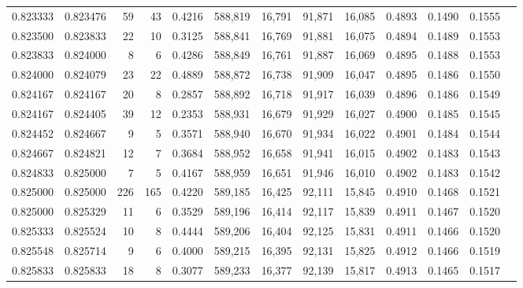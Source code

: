 \begin{tabular}{rrrrrrrrrrrrr}
0.823333 & 0.823476 &    59 &  43 &                                     0.4216 & 588,819 &  16,791 &  91,871 &  16,085 & 0.4893 & 0.1490 & 0.1555 \\
0.823500 & 0.823833 &    22 &  10 &                                     0.3125 & 588,841 &  16,769 &  91,881 &  16,075 & 0.4894 & 0.1489 & 0.1553 \\
0.823833 & 0.824000 &     8 &   6 &                                     0.4286 & 588,849 &  16,761 &  91,887 &  16,069 & 0.4895 & 0.1488 & 0.1553 \\
0.824000 & 0.824079 &    23 &  22 &                                     0.4889 & 588,872 &  16,738 &  91,909 &  16,047 & 0.4895 & 0.1486 & 0.1550 \\
0.824167 & 0.824167 &    20 &   8 &                                     0.2857 & 588,892 &  16,718 &  91,917 &  16,039 & 0.4896 & 0.1486 & 0.1549 \\
0.824167 & 0.824405 &    39 &  12 &                                     0.2353 & 588,931 &  16,679 &  91,929 &  16,027 & 0.4900 & 0.1485 & 0.1545 \\
0.824452 & 0.824667 &     9 &   5 &                                     0.3571 & 588,940 &  16,670 &  91,934 &  16,022 & 0.4901 & 0.1484 & 0.1544 \\
0.824667 & 0.824821 &    12 &   7 &                                     0.3684 & 588,952 &  16,658 &  91,941 &  16,015 & 0.4902 & 0.1483 & 0.1543 \\
0.824833 & 0.825000 &     7 &   5 &                                     0.4167 & 588,959 &  16,651 &  91,946 &  16,010 & 0.4902 & 0.1483 & 0.1542 \\
0.825000 & 0.825000 &   226 & 165 &                                     0.4220 & 589,185 &  16,425 &  92,111 &  15,845 & 0.4910 & 0.1468 & 0.1521 \\
0.825000 & 0.825329 &    11 &   6 &                                     0.3529 & 589,196 &  16,414 &  92,117 &  15,839 & 0.4911 & 0.1467 & 0.1520 \\
0.825333 & 0.825524 &    10 &   8 &                                     0.4444 & 589,206 &  16,404 &  92,125 &  15,831 & 0.4911 & 0.1466 & 0.1520 \\
0.825548 & 0.825714 &     9 &   6 &                                     0.4000 & 589,215 &  16,395 &  92,131 &  15,825 & 0.4912 & 0.1466 & 0.1519 \\
0.825833 & 0.825833 &    18 &   8 &                                     0.3077 & 589,233 &  16,377 &  92,139 &  15,817 & 0.4913 & 0.1465 & 0.1517 \\

\end{tabular}

